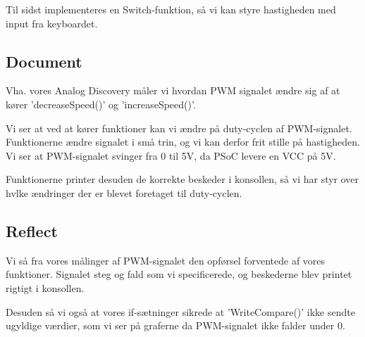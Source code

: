 \documentclass[../main.tex]{subfiles}
\begin{document}
Til sidst implementeres en Switch-funktion, så vi kan styre hastigheden med input fra keyboardet.

\subsection{Document}
Vha. vores Analog Discovery måler vi hvordan PWM signalet ændre sig af at kører ’decreaseSpeed()’ og ’increaseSpeed()’.


Vi ser at ved at kører funktioner kan vi ændre på duty-cyclen af PWM-signalet. Funktionerne ændre signalet i små trin, og vi kan derfor frit stille på hastigheden. Vi ser at PWM-signalet svinger fra 0 til 5V, da PSoC levere en VCC på 5V.

Funktionerne printer desuden de korrekte beskeder i konsollen, så vi har styr over hvlke ændringer der er blevet foretaget til duty-cyclen.

\subsection{Reflect}    
Vi så fra vores målinger af PWM-signalet den opførsel forventede af vores funktioner. Signalet steg og fald som vi specificerede, og beskederne blev printet rigtigt i konsollen.

Desuden så vi også at vores if-sætninger sikrede at ’WriteCompare()’ ikke sendte ugyldige værdier, som vi ser på graferne da PWM-signalet ikke falder under 0.
\end{document}
